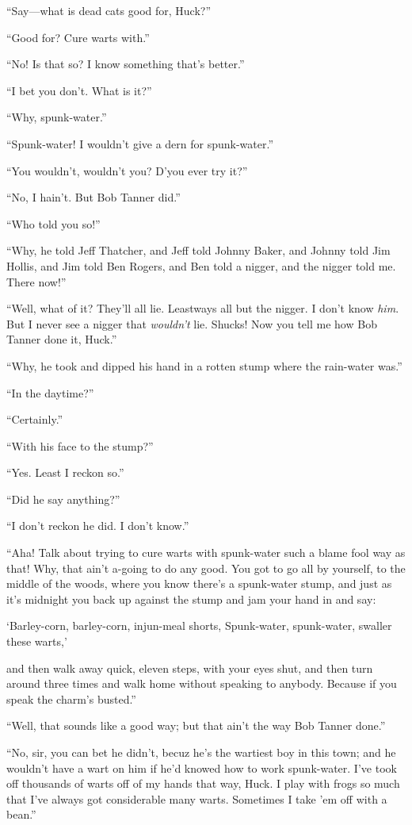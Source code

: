 \documentclass{book}
\begin{document}
“Say—what is dead cats good for, Huck?”

“Good for? Cure warts with.”

“No! Is that so? I know something that’s better.”

“I bet you don’t. What is it?”

“Why, spunk-water.”

“Spunk-water! I wouldn’t give a dern for spunk-water.”

“You wouldn’t, wouldn’t you? D’you ever try it?”

“No, I hain’t. But Bob Tanner did.”

“Who told you so!”

“Why, he told Jeff Thatcher, and Jeff told Johnny Baker, and Johnny told Jim Hollis, and Jim told Ben Rogers, and Ben told a nigger, and the nigger told me. There now!”

“Well, what of it? They’ll all lie. Leastways all but the nigger. I don’t know \emph{him}. But I never see a nigger that \emph{wouldn’t} lie. Shucks! Now you tell me how Bob Tanner done it, Huck.”

“Why, he took and dipped his hand in a rotten stump where the rain-water was.”

“In the daytime?”

“Certainly.”

“With his face to the stump?”

“Yes. Least I reckon so.”

“Did he say anything?”

“I don’t reckon he did. I don’t know.”

“Aha! Talk about trying to cure warts with spunk-water such a blame fool way as that! Why, that ain’t a-going to do any good. You got to go all by yourself, to the middle of the woods, where you know there’s a spunk-water stump, and just as it’s midnight you back up against the stump and jam your hand in and say:

‘Barley-corn, barley-corn, injun-meal shorts, Spunk-water, spunk-water, swaller these warts,’

and then walk away quick, eleven steps, with your eyes shut, and then turn around three times and walk home without speaking to anybody. Because if you speak the charm’s busted.”

“Well, that sounds like a good way; but that ain’t the way Bob Tanner done.”

“No, sir, you can bet he didn’t, becuz he’s the wartiest boy in this town; and he wouldn’t have a wart on him if he’d knowed how to work spunk-water. I’ve took off thousands of warts off of my hands that way, Huck. I play with frogs so much that I’ve always got considerable many warts. Sometimes I take ’em off with a bean.”
\end{document}
